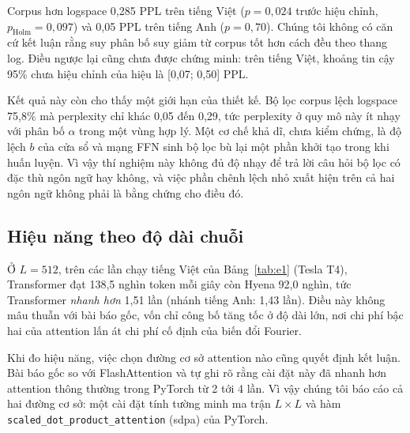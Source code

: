 \documentclass[11pt]{article}
\begin{document}
Corpus hơn \textsf{logspace} 0,285 PPL trên tiếng Việt ($p = 0{,}024$ trước hiệu
chỉnh, $p_{\text{Holm}} = 0{,}097$) và 0,05 PPL trên tiếng Anh ($p = 0{,}70$).
Chúng tôi không có căn cứ kết luận rằng suy phân bố suy giảm từ corpus tốt hơn
cách đều theo thang log. Điều ngược lại cũng chưa được chứng minh: trên tiếng
Việt, khoảng tin cậy 95\% chưa hiệu chỉnh của hiệu là [0,07; 0,50] PPL.

Kết quả này còn cho thấy một giới hạn của thiết kế. Bộ lọc corpus lệch
\textsf{logspace} 75,8\% mà perplexity chỉ khác 0,05 đến 0,29, tức perplexity ở
quy mô này ít nhạy với phân bố $\alpha$ trong một vùng hợp lý. Một cơ chế khả dĩ,
chưa kiểm chứng, là độ lệch $b$ của cửa sổ và mạng FFN sinh bộ lọc bù lại một
phần khởi tạo trong khi huấn luyện. Vì vậy thí nghiệm này không đủ độ nhạy để trả lời câu
hỏi bộ lọc có đặc thù ngôn ngữ hay không, và việc phần chênh lệch nhỏ xuất hiện
trên cả hai ngôn ngữ không phải là bằng chứng cho điều đó.

\subsection{Hiệu năng theo độ dài chuỗi}
\label{sec:hieunang}

Ở $L = 512$, trên các lần chạy tiếng Việt của Bảng~\ref{tab:e1} (Tesla T4),
Transformer đạt 138,5 nghìn token mỗi giây còn Hyena 92,0 nghìn, tức Transformer
\emph{nhanh hơn} 1,51 lần (nhánh tiếng Anh: 1,43 lần). Điều này không mâu thuẫn
với bài báo gốc, vốn chỉ công bố tăng tốc ở độ dài lớn, nơi chi phí bậc hai của
attention lấn át chi phí cố định của biến đổi Fourier.

Khi đo hiệu năng, việc chọn đường cơ sở attention nào cũng quyết định kết luận.
Bài báo gốc so với FlashAttention \citep{dao2022flashattention} và tự ghi rõ
rằng cài đặt này đã nhanh hơn attention thông thường trong PyTorch từ 2 tới 4
lần. Vì vậy chúng tôi báo cáo cả hai đường cơ sở: một cài đặt tính tường minh ma
trận $L \times L$ và hàm \texttt{scaled\_dot\_product\_attention} (\textsf{sdpa})
của PyTorch.
\end{document}
